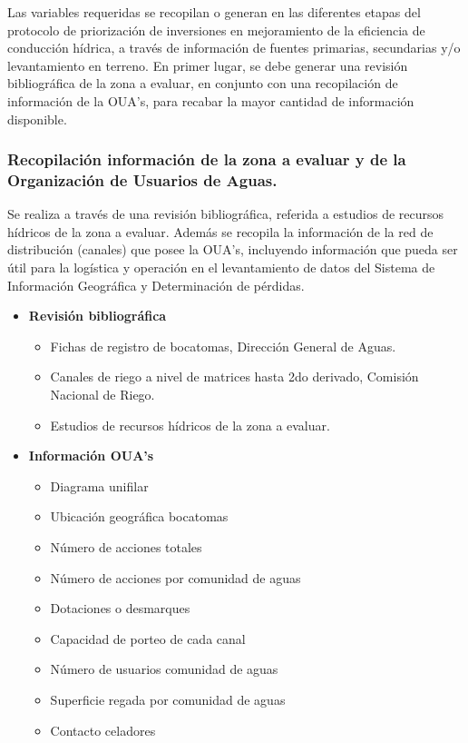 \documentclass[]{article}
\begin{document}
Las variables requeridas se recopilan o generan en las diferentes etapas del protocolo de priorización de inversiones en mejoramiento de la eficiencia de conducción hídrica, a través de información de fuentes primarias, secundarias y/o levantamiento en terreno. En primer lugar, se debe generar una revisión bibliográfica de la zona a evaluar, en conjunto con una recopilación de información de la OUA's, para recabar la mayor cantidad de información disponible.

\subsubsection{Recopilación información de la zona a evaluar y de la Organización de Usuarios de Aguas.}

Se realiza a través de una revisión bibliográfica, referida a estudios de recursos hídricos de la zona a evaluar. Además se recopila la información de la red de distribución (canales) que posee la OUA's, incluyendo información que pueda ser útil para la logística y operación en el levantamiento de datos del Sistema de Información Geográfica y Determinación de pérdidas.

\begin{itemize}
	\item \textbf{Revisión bibliográfica}
	\begin{itemize}	
		\item Fichas de registro de bocatomas, Dirección General de Aguas.
		\item Canales de riego a nivel de matrices hasta 2do derivado, Comisión Nacional de Riego.
		\item Estudios de recursos hídricos de la zona a evaluar.
	\end{itemize}
	\item \textbf{Información OUA's}
	\begin{itemize}	
		\item Diagrama unifilar
		\item Ubicación geográfica bocatomas
		\item Número de acciones totales
		\item Número de acciones por comunidad de aguas
		\item Dotaciones o desmarques
		\item Capacidad de porteo de cada canal
		\item Número de usuarios comunidad de aguas
		\item Superficie regada por comunidad de aguas
		\item Contacto celadores
	\end{itemize}
\end{itemize}	
\end{document}
